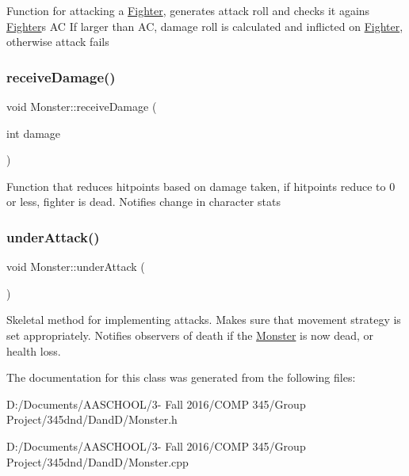 Function for attacking a \hyperlink{class_fighter}{Fighter}, generates attack roll and checks it agains \hyperlink{class_fighter}{Fighter}\textquotesingle{}s AC If larger than AC, damage roll is calculated and inflicted on \hyperlink{class_fighter}{Fighter}, otherwise attack fails \hypertarget{class_monster_a8a0aadbb74bed6181adb79b58d67d0a8}{}\label{class_monster_a8a0aadbb74bed6181adb79b58d67d0a8} 
\subsubsection{\texorpdfstring{receive\+Damage()}{receiveDamage()}}
{\footnotesize\ttfamily void Monster\+::receive\+Damage (\begin{DoxyParamCaption}\item[{int}]{damage }\end{DoxyParamCaption})}

Function that reduces hitpoints based on damage taken, if hitpoints reduce to 0 or less, fighter is dead. Notifies change in character stats \hypertarget{class_monster_a217f6f3df7398d65ffea6964931207f2}{}\label{class_monster_a217f6f3df7398d65ffea6964931207f2} 
\subsubsection{\texorpdfstring{under\+Attack()}{underAttack()}}
{\footnotesize\ttfamily void Monster\+::under\+Attack (\begin{DoxyParamCaption}{ }\end{DoxyParamCaption})\hspace{0.3cm}{\ttfamily [virtual]}}

Skeletal method for implementing attacks. Makes sure that movement strategy is set appropriately. Notifies observers of death if the \hyperlink{class_monster}{Monster} is now dead, or health loss. 

The documentation for this class was generated from the following files\+:\begin{DoxyCompactItemize}
\item 
D\+:/\+Documents/\+A\+A\+S\+C\+H\+O\+O\+L/3-\/ Fall 2016/\+C\+O\+M\+P 345/\+Group Project/345dnd/\+Dand\+D/Monster.\+h\item 
D\+:/\+Documents/\+A\+A\+S\+C\+H\+O\+O\+L/3-\/ Fall 2016/\+C\+O\+M\+P 345/\+Group Project/345dnd/\+Dand\+D/Monster.\+cpp\end{DoxyCompactItemize}
